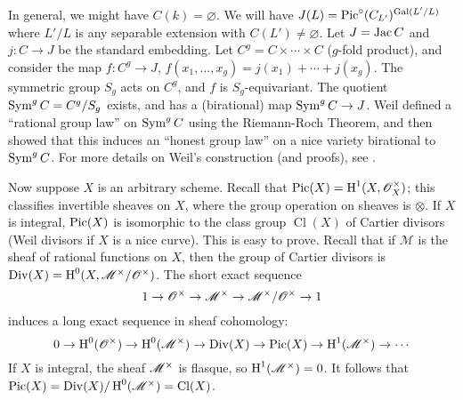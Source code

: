In general, we might have $C(k)=\varnothing$. We will have 
$J(L)=\operatorname{Pic}^\circ(C_{L'})^{\operatorname{Gal}(L'/L)}$ where $L'/L$ is any separable extension 
with $C(L')\ne\varnothing$. 
Let $J=\operatorname{Jac} C$ and $j:C\to J$ be the standard embedding. Let 
$C^g=C\times\cdots\times C$ ($g$-fold product), and consider the map 
$f:C^g\to J$, $f(x_1,\dotsc,x_g)=j(x_1)+\cdots+j(x_g)$. The symmetric 
group $S_g$ acts on $C^g$, and $f$ is $S_g$-equivariant. The quotient 
$\operatorname{Sym}^g C = C^g/S_g$ exists, and has a (birational) map 
$\operatorname{Sym}^g C\to J$. Weil defined a ``rational 
group law'' on $\operatorname{Sym}^g C$ using the Riemann-Roch Theorem, and 
then showed that this induces an ``honest group law'' on a nice variety 
birational to $\operatorname{Sym}^g C$. For 
more details on Weil's construction (and proofs), see \cite[III.7]{mi-av}. 



Now suppose $X$ is an arbitrary scheme. Recall that 
$\operatorname{Pic}(X)=\operatorname{H}^1(X,\mathscr{O}_X^\times)$; this classifies invertible sheaves on 
$X$, where the group operation on sheaves is $\otimes$. If $X$ is integral, 
$\operatorname{Pic}(X)$ is isomorphic to the class group $\operatorname{Cl}(X)$ of Cartier 
divisors (Weil divisors if $X$ is a nice curve). This is easy to prove. Recall 
that if $\mathscr{M}$ is the sheaf of rational functions on $X$, then the 
group of Cartier divisors is $\operatorname{Div}(X) = \operatorname{H}^0(X,\mathscr{M}^\times/\mathscr{O}^\times)$. 
The short exact sequence 
\[
  1 \to \mathscr{O}^\times \to \mathscr{M}^\times\to \mathscr{M}^\times/\mathscr{O}^\times \to 1
\]
induces a long exact sequence in sheaf cohomology:
\[
  0 \to \operatorname{H}^0(\mathscr{O}^\times) \to \operatorname{H}^0(\mathscr{M}^\times) \to \operatorname{Div}(X) \to \operatorname{Pic}(X) \to \operatorname{H}^1(\mathscr{M}^\times) \to \cdots
\]
If $X$ is integral, the sheaf $\mathscr{M}^\times$ is flasque, so $\operatorname{H}^1(\mathscr{M}^\times)=0$. 
It follows that 
$\operatorname{Pic}(X)=\operatorname{Div}(X)/\operatorname{H}^0(\mathscr{M}^\times) = \operatorname{Cl}(X)$. 

